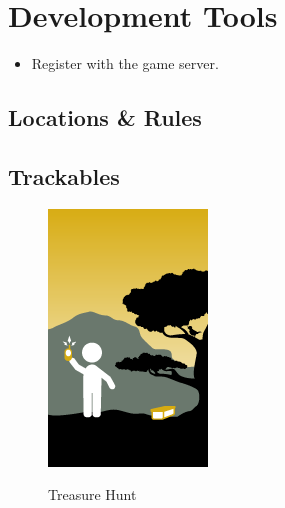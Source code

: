 \makeatletter
\def\@makechapterhead#1{%
  \vspace*{50\p@}%
  {\parindent \z@ \centering\normalfont
    \ifnum \c@secnumdepth >\m@ne
      \if@mainmatter
         \Large\bfseries \@chapapp\space \thechapter
        \par\nobreak
        \vskip 20\p@
      \fi
    \fi
    \interlinepenalty\@M
     \Large \bfseries #1\par\nobreak

    \vskip 40\p@
  }}
\def\@makeschapterhead#1{%
  \vspace*{50\p@}%
  {\parindent \z@ \centering
    \normalfont
    \interlinepenalty\@M
    \Large\bfseries  #1\par\nobreak
    \vskip 40\p@
  }}
\makeatother
\titlespacing*{\chapter}{0pt}{0pt}{12pt}


\chapter{Development Tools}

\begin{itemize}

 \item Register with the game server.

 
\end{itemize}




\section{Locations & Rules }



\section{Trackables}



\begin{figure} [ht]
\centering
\includegraphics[scale=0.5]{cache}\\
\caption{Treasure Hunt }
\label{the-label-for-cross-referencing}
\end{figure}














